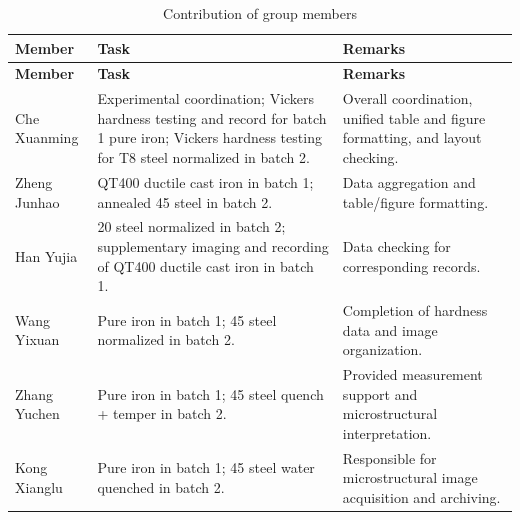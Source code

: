 \documentclass[12pt,a4paper,fontset=none]{ctexart}
\begin{document}
\noindent
\small
\begin{longtable}{@{}L{0.171\textwidth}@{}L{0.352\textwidth}@{}P{0.427\textwidth}@{}}
\caption{Contribution of group members}\\
\toprule
\textbf{Member} & \textbf{Task} & \textbf{Remarks} \\
\midrule
\endfirsthead
\toprule
\textbf{Member} & \textbf{Task} & \textbf{Remarks} \\
\midrule
\endhead
\midrule
\endfoot
\endlastfoot
Che Xuanming & Experimental coordination; Vickers hardness testing and record for batch 1 pure iron; Vickers hardness testing for T8 steel normalized in batch 2. & Overall coordination, unified table and figure formatting, and layout checking. \\
Zheng Junhao & QT400 ductile cast iron in batch 1; annealed 45 steel in batch 2. & Data aggregation and table/figure formatting. \\
Han Yujia & 20 steel normalized in batch 2; supplementary imaging and recording of QT400 ductile cast iron in batch 1. & Data checking for corresponding records. \\
Wang Yixuan & Pure iron in batch 1; 45 steel normalized in batch 2. & Completion of hardness data and image organization. \\
Zhang Yuchen & Pure iron in batch 1; 45 steel quench + temper in batch 2. & Provided measurement support and microstructural interpretation. \\
Kong Xianglu & Pure iron in batch 1; 45 steel water quenched in batch 2. & Responsible for microstructural image acquisition and archiving. \\
\bottomrule
\end{longtable}
\end{document}
